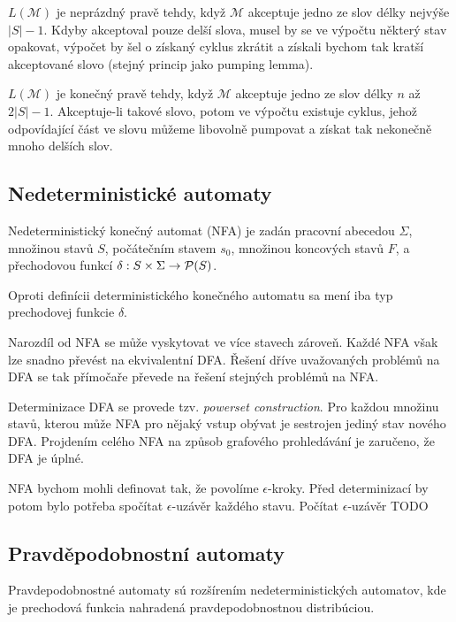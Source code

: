 $L(\mathcal{M})$ je neprázdný pravě tehdy, když $\mathcal{M}$
akceptuje jedno ze slov délky nejvýše $\lvert S \rvert -1$.
Kdyby akceptoval pouze delší slova, musel by se ve výpočtu některý stav
opakovat, výpočet by šel o získaný cyklus zkrátit a získali bychom tak
kratší akceptované slovo (stejný princip jako pumping lemma).

$L(\mathcal{M})$ je konečný pravě tehdy, když $\mathcal{M}$
akceptuje jedno ze slov délky $n$ až $2 \lvert S \rvert - 1$.
Akceptuje-li takové slovo, potom ve výpočtu existuje cyklus, jehož
odpovídající část ve slovu můžeme libovolně pumpovat a získat tak
nekonečně mnoho delších slov.

\subsection{Nedeterministické automaty}

\begin{definition}
    Nedeterministický konečný automat (NFA) je zadán
    pracovní abecedou $\Sigma$,
    množinou stavů $S$,
    počátečním stavem $s_0$,
    množinou koncových stavů $F$,
    a přechodovou funkcí $\delta : S \times \Sigma \to \mathcal{P}(S)$.
\end{definition}

Oproti definícii deterministického konečného automatu sa mení iba
typ prechodovej funkcie $\delta$.

Narozdíl od NFA se může vyskytovat ve více stavech zároveň. Každé NFA
však lze snadno převést na ekvivalentní DFA. Řešení dříve uvažovaných
problémů na DFA se tak přímočaře převede na řešení stejných problémů na
NFA.

Determinizace DFA se provede tzv. {\em powerset construction}. Pro
každou množinu stavů, kterou může NFA pro nějaký vstup obývat je
sestrojen jediný stav nového DFA. Projdením celého NFA na způsob
grafového prohledávání je zaručeno, že DFA je úplné.

NFA bychom mohli definovat tak, že povolíme $\epsilon$-kroky. Před
determinizací by potom bylo potřeba spočítat $\epsilon$-uzávěr každého
stavu. Počítat $\epsilon$-uzávěr TODO

\subsection{Pravděpodobnostní automaty}

Pravdepodobnostné automaty sú rozšírením nedeterministických
automatov, kde je prechodová funkcia nahradená pravdepodobnostnou
distribúciou.

